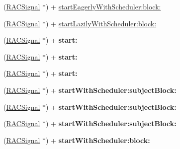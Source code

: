 \begin{DoxyCompactItemize}
(\mbox{\hyperlink{interface_r_a_c_signal}{R\+A\+C\+Signal}} $\ast$) + \mbox{\hyperlink{interface_r_a_c_signal_a6bee49e8a8ee2f41bcec31bb86948b37}{start\+Eagerly\+With\+Scheduler\+:block\+:}}
\item 
(\mbox{\hyperlink{interface_r_a_c_signal}{R\+A\+C\+Signal}} $\ast$) + \mbox{\hyperlink{interface_r_a_c_signal_adbef9afea68ea6a2a81bb3115f47c22c}{start\+Lazily\+With\+Scheduler\+:block\+:}}
\item 
\mbox{\label{interface_r_a_c_signal_a0951a904f858019067c4363ede032431}} 
(\mbox{\hyperlink{interface_r_a_c_signal}{R\+A\+C\+Signal}} $\ast$) + {\bfseries start\+:}
\item 
\mbox{\label{interface_r_a_c_signal_a0951a904f858019067c4363ede032431}} 
(\mbox{\hyperlink{interface_r_a_c_signal}{R\+A\+C\+Signal}} $\ast$) + {\bfseries start\+:}
\item 
\mbox{\label{interface_r_a_c_signal_a0951a904f858019067c4363ede032431}} 
(\mbox{\hyperlink{interface_r_a_c_signal}{R\+A\+C\+Signal}} $\ast$) + {\bfseries start\+:}
\item 
\mbox{\label{interface_r_a_c_signal_aba6b849d98a4e495d04e0124b3f3bcdb}} 
(\mbox{\hyperlink{interface_r_a_c_signal}{R\+A\+C\+Signal}} $\ast$) + {\bfseries start\+With\+Scheduler\+:subject\+Block\+:}
\item 
\mbox{\label{interface_r_a_c_signal_aba6b849d98a4e495d04e0124b3f3bcdb}} 
(\mbox{\hyperlink{interface_r_a_c_signal}{R\+A\+C\+Signal}} $\ast$) + {\bfseries start\+With\+Scheduler\+:subject\+Block\+:}
\item 
\mbox{\label{interface_r_a_c_signal_aba6b849d98a4e495d04e0124b3f3bcdb}} 
(\mbox{\hyperlink{interface_r_a_c_signal}{R\+A\+C\+Signal}} $\ast$) + {\bfseries start\+With\+Scheduler\+:subject\+Block\+:}
\item 
\mbox{\label{interface_r_a_c_signal_a06ac2ec4a0d7d06cfc61b0ba934a31ac}} 
(\mbox{\hyperlink{interface_r_a_c_signal}{R\+A\+C\+Signal}} $\ast$) + {\bfseries start\+With\+Scheduler\+:block\+:}
\item 
\mbox{\label{interface_r_a_c_signal_a06ac2ec4a0d7d06cfc61b0ba934a31ac}} 

\end{DoxyCompactItemize}
